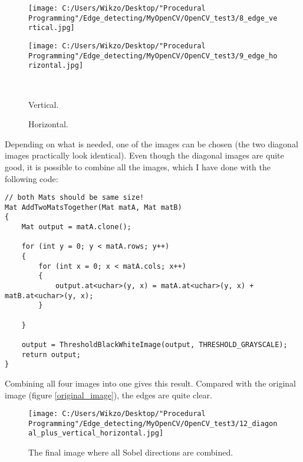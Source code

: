 \begin{figure}[htbp]\centering
	\begin{minipage}[b]{0.48\textwidth}\centering
		\texttt{[image: C:/Users/Wikzo/Desktop/"Procedural Programming"/Edge\_detecting/MyOpenCV/OpenCV\_test3/8\_edge\_vertical.jpg]} %
	\end{minipage}\hfill
	\begin{minipage}[b]{0.48\textwidth}\centering
		\texttt{[image: C:/Users/Wikzo/Desktop/"Procedural Programming"/Edge\_detecting/MyOpenCV/OpenCV\_test3/9\_edge\_horizontal.jpg]} %
	\end{minipage}\\ %
	\begin{minipage}[t]{0.48\textwidth}
		\caption{Vertical.} %
		\label{vertical}
	\end{minipage}\hfill
	\begin{minipage}[t]{0.48\textwidth}
		\caption{Horizontal.} %
		\label{horizontal}
	\end{minipage}
\end{figure}

Depending on what is needed, one of the images can be chosen (the two diagonal images practically look identical). Even though the diagonal images are quite good, it is possible to combine all the images, which I have done with the following code:

\begin{lstlisting}
// both Mats should be same size!
Mat AddTwoMatsTogether(Mat matA, Mat matB)
{
	Mat output = matA.clone();

	for (int y = 0; y < matA.rows; y++)
	{
		for (int x = 0; x < matA.cols; x++)
		{
			output.at<uchar>(y, x) = matA.at<uchar>(y, x) + matB.at<uchar>(y, x);
		}

	}

	output = ThresholdBlackWhiteImage(output, THRESHOLD_GRAYSCALE);
	return output;
}
\end{lstlisting}

Combining all four images into one gives this result. Compared with the original image (figure \ref{original_image}), the edges are quite clear.

\begin{figure} [htbp]
\texttt{[image: C:/Users/Wikzo/Desktop/"Procedural Programming"/Edge\_detecting/MyOpenCV/OpenCV\_test3/12\_diagonal\_plus\_vertical\_horizontal.jpg]}
\centering
\caption{The final image where all Sobel directions are combined.}
\label{threshold}
\end{figure}

